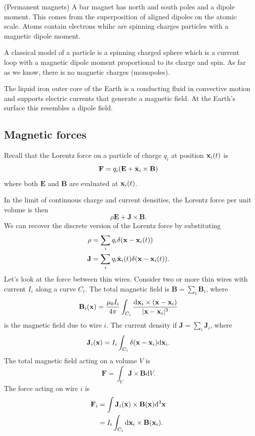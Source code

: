 \documentclass{article}
\begin{document}
\begin{definition}
	(Permanent magnets) A bar magnet has north and south poles and a dipole moment. This comes from the superposition of aligned dipoles on the atomic scale. Atoms contain electrons whihc are spinning charges particles with a magnetic dipole moment.
\end{definition}
A classical model of a particle is a spinning charged sphere which is a current loop with a magnetic dipole moment proportional to its charge and spin. As far as we know, there is no magnetic charges (monopoles).\par
The liquid iron outer core of the Earth is a conducting fluid in convective motion and supports electric currents that generate a magnetic field. At the Earth's surface this resembles a dipole field.
\subsection{Magnetic forces}
Recall that the Lorentz force on a particle of charge $ q_i $ at position $ \mathbf{x}_i(t) $ is
\[
  \mathbf F = q_i(\mathbf E+\dot{\mathbf{x}}_i\times \mathbf B)
\]
where both $ \mathbf E $ and $ \mathbf B $ are evaluated at $ \mathbf{x}_i(t) $.\par
In the limit of continuous charge and current densities, the Lorentz force per unit volume is then
\[
  \rho\mathbf E  + \mathbf J\times \mathbf B.
\]
We can recover the discrete version of the Lorentz force by substituting
\begin{align*}
	\rho &= \sum_i q_i\delta(\mathbf{x}-\mathbf{x}_i(t))\\
	\mathbf J &= \sum_i q_i\dot{\mathbf{x}}_i(t)\delta(\mathbf{x}-\mathbf{x}_i(t)).
\end{align*}
Let's look at the force between thin wires. Consider two or more thin wires with current $ I_i $ along a curve $ C_i $. The total magnetic field is $ \mathbf B = \sum_i \mathbf B_i $, where
\[
	\mathbf B_i(\mathbf{x})= \frac{\mu_0 I_i}{4\pi} \int_{C_i} \frac{\mathrm d\mathbf{x}_i \times (\mathbf{x}-\mathbf{x}_i)}{|\mathbf{x}-\mathbf{x}_i|^3}
\]
is the magnetic field due to wire $ i $. The current density if $ \mathbf J = \sum_i \mathbf J_i $, where
\[
	\mathbf J_i(\mathbf{x}) = I_i\int_{C_i} \delta(\mathbf{x}-\mathbf{x}_i)\mathrm d\mathbf{x}_i.
\]
The total magnetic field acting on a volume $ V $ is
\[
  \mathbf F = \int_V \mathbf J\times \mathbf B \mathrm dV.
\]
The force acting on wire $ i $ is
\begin{align*}
	\mathbf F_i &= \int \mathbf J_i(\mathbf{x})\times\mathbf B(\mathbf{x})\mathrm d^3\mathbf{x}\\
		    &= I_i\int_{C_i}\mathrm d\mathbf{x}_i\times \mathbf B(\mathbf{x}_i).
\end{align*}
\end{document}
